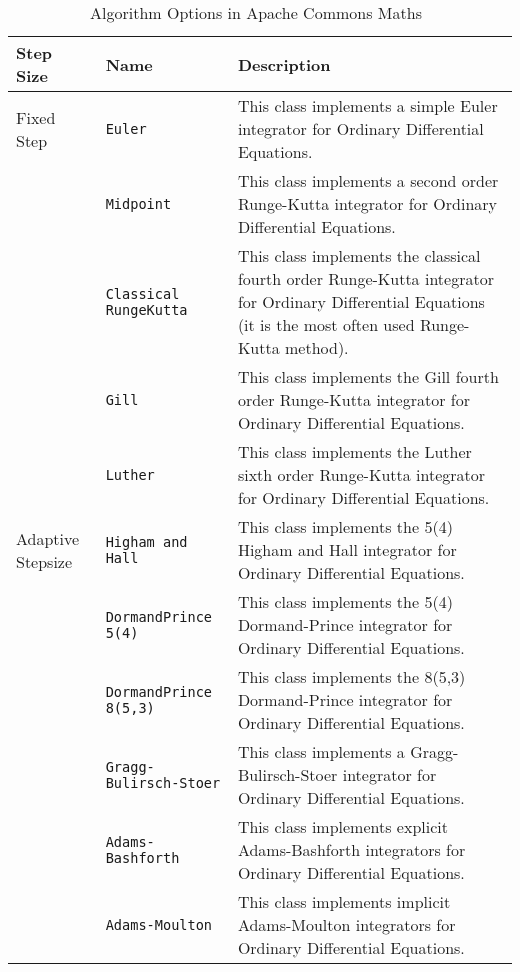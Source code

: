 \begin{table}[ht]
\begin{tabular}{ p{} | p{} p{} }
	\textbf{Step Size} & \textbf{Name} & \textbf{Description} \\
	\toprule
	Fixed Step & \verb|Euler| & This class implements a simple Euler integrator for Ordinary Differential Equations.\\ \hline
	& \verb|Midpoint| & This class implements a second order Runge-Kutta integrator for Ordinary Differential Equations.\\ \hline
	& \verb|Classical RungeKutta| & This class implements the classical fourth order Runge-Kutta integrator for Ordinary Differential Equations (it is the most often used Runge-Kutta method).\\ \hline
	& \verb|Gill| & This class implements the Gill fourth order Runge-Kutta integrator for Ordinary Differential Equations.\\ \hline
	& \verb|Luther| & This class implements the Luther sixth order Runge-Kutta integrator for Ordinary Differential Equations.\\ \hline
	Adaptive Stepsize & \verb|Higham and Hall| & This class implements the 5(4) Higham and Hall integrator for Ordinary Differential Equations.\\ \hline
	& \verb|DormandPrince 5(4)| & This class implements the 5(4) Dormand-Prince integrator for Ordinary Differential Equations.\\ \hline
	& \verb|DormandPrince 8(5,3)| & This class implements the 8(5,3) Dormand-Prince integrator for Ordinary Differential Equations.\\ \hline
	& \verb|Gragg-Bulirsch-Stoer| & This class implements a Gragg-Bulirsch-Stoer integrator for Ordinary Differential Equations.\\ \hline
	& \verb|Adams-Bashforth| & This class implements explicit Adams-Bashforth integrators for Ordinary Differential Equations.\\ \hline
	& \verb|Adams-Moulton| & This class implements implicit Adams-Moulton integrators for Ordinary Differential Equations.\\
	\bottomrule	
\end{tabular}	
\caption{Algorithm Options in Apache Commons Maths~\citep{apachefun}}	
\label{tab_algacm}
\end{table}

